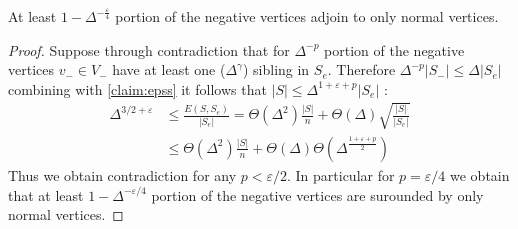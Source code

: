 \begin{claim}
  \label{claim:portion}
  At least $ 1- \Delta^{-\frac{\varepsilon}{4}}$ portion of the negative vertices adjoin to only normal vertices. 
\end{claim}
\begin{proof}
  Suppose through contradiction that for $\Delta^{-p}$ portion of the negative vertices $v_{-}\in V_{-}$ have at least one ($\Delta^{\gamma}$) sibling in $S_{e}$. Therefore $ \Delta^{-p} |S_{-}| \le \Delta |S_{e}|$ combining with \cref{claim:epss} it follows that $|S| \le \Delta^{1+\varepsilon + p }|S_{e}|$ : 
  \begin{equation*}
    \begin{split}
      \Delta^{3/2 + \varepsilon} & \le \frac{E(S,S_{e})}{|S_{e}|} = \Theta\left( \Delta^{2} \right)\frac{|S|}{n} + \Theta\left( \Delta \right)\sqrt{ \frac{|S|}{|S_{e}|}  }\\ 
      & \le \Theta(\Delta^{2}) \frac{|S|}{n} + \Theta(\Delta) \Theta\left( \Delta^{\frac{1+\varepsilon + p}{2}} \right)  
    \end{split}
  \end{equation*} 
  Thus we obtain contradiction for any $p < \varepsilon/2$. In particular for $p = \varepsilon/4$ we obtain that at least $1 - \Delta^{-\varepsilon/4}$ portion of the negative vertices are surounded by only normal vertices. 
 \end{proof}

